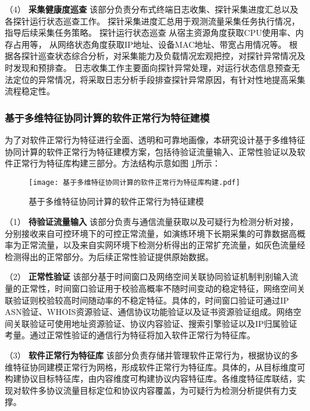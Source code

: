 （4） \textbf{采集健康度巡查}\quad
该部分负责分布式终端日志收集、探针采集进度汇总以及各探针运行状态巡查工作。
探针采集进度汇总用于观测流量采集任务执行情况，指导后续采集任务策略。
探针运行状态巡查
从宿主资源角度获取CPU使用率、内存占用等，
从网络状态角度获取IP地址、设备MAC地址、带宽占用情况等。
根据各探针巡查状态综合分析，对采集能力及负载情况宏观把控，对探针异常情况及时发现和预排查。
日志收集工作主要面向探针异常处理，对运行状态信息预查无法定位的异常情况，将采取日志分析手段排查探针异常原因，有针对性地提高采集流程稳定性。

\subsubsection{基于多维特征协同计算的软件正常行为特征建模}

为了对软件正常行为特征进行全面、透明和可靠地画像，本研究设计基于多维特征协同计算的软件正常行为特征建模方案，包括待验证流量输入、正常性验证以及软件正常行为特征库构建三部分。方法结构示意如图 \ref{fig:基于多维特征协同计算的软件正常行为特征建模}所示：
 
\FloatBarrier
 
\begin{figure}[ht]
  \centering
  \texttt{[image: 基于多维特征协同计算的软件正常行为特征库构建.pdf]}
  \caption{基于多维特征协同计算的软件正常行为特征建模}
  \label{fig:基于多维特征协同计算的软件正常行为特征建模}
\end{figure} 

\FloatBarrier


（1） \textbf{待验证流量输入}\quad
该部分负责与通信流量获取以及可疑行为检测分析对接，分别接收来自可控环境下的可控正常流量，如演练环境下长期采集的可靠数据高概率为正常流量，以及来自实网环境下检测分析得出的正常扩充流量，如灰色流量经检测得出的正常部分。为后续正常性验证提供原始数据。

（2） \textbf{正常性验证}\quad
该部分基于时间窗口及网络空间关联协同验证机制判别输入流量的正常性，时间窗口验证用于校验高概率不随时间变动的稳定特征，网络空间关联验证则校验较高时间随动率的不稳定特征。具体的，时间窗口验证可通过IP ASN验证、WHOIS资源验证、通信协议功能验证以及证书资源验证组成。网络空间关联验证可使用地址资源验证、协议内容验证、搜索引擎验证以及IP归属验证考量。通过正常性验证的通信行为特征将加入软件正常行为特征库。

（3） \textbf{软件正常行为特征库}\quad
该部分负责存储并管理软件正常行为，根据协议的多维特征协同建模正常行为网格，形成软件正常行为特征库。具体的，从目标维度可构建协议目标特征库，由内容维度可构建协议内容特征库。各维度特征库联结，实现对软件多协议流量目标定位和协议内容覆盖，为可疑行为检测分析提供有力支撑。 
 
